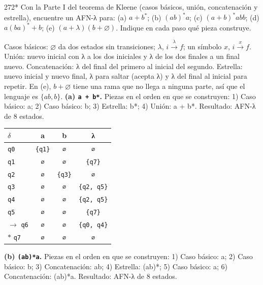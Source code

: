 \documentclass[11pt]{article}
\begin{document}


\begin{ejercicio}{272}{*}
Con la Parte I del teorema de Kleene (casos básicos, unión, concatenación y estrella), encuentre un AFN-λ para: (a) $a + b^*$; (b) $(ab)^*a$; (c) $(a + b)^*abb$; (d) $a(ba)^* + b$; (e) $(a + \lambda)(b + \varnothing)$. Indique en cada paso qué pieza construye.
\end{ejercicio}
\proc Casos básicos: $\varnothing$ da dos estados sin transiciones; $\lambda$, $i \xrightarrow{\lambda} f$; un símbolo $x$, $i \xrightarrow{x} f$. Unión: nuevo inicial con λ a los dos iniciales y λ de los dos finales a un final nuevo. Concatenación: λ del final del primero al inicial del segundo. Estrella: nuevo inicial y nuevo final, λ para saltar (acepta λ) y λ del final al inicial para repetir. En (e), $b + \varnothing$ tiene una rama que no llega a ninguna parte, así que el lenguaje es $\{ab, b\}$.
\textbf{(a) \texttt{a + b*}.} Piezas en el orden en que se construyen: 1) Caso básico: a; 2) Caso básico: b; 3) Estrella: b*; 4) Unión: a + b*. Resultado: AFN-λ de 8 estados.
\begin{center}\small\begin{tabular}{lccc}\toprule
$\delta$ & a & b & λ \\\midrule
 \texttt{q0} & \texttt{\{q1\}} & \texttt{∅} & \texttt{∅} \\
 \texttt{q1} & \texttt{∅} & \texttt{∅} & \texttt{\{q7\}} \\
 \texttt{q2} & \texttt{∅} & \texttt{\{q3\}} & \texttt{∅} \\
 \texttt{q3} & \texttt{∅} & \texttt{∅} & \texttt{\{q2, q5\}} \\
 \texttt{q4} & \texttt{∅} & \texttt{∅} & \texttt{\{q2, q5\}} \\
 \texttt{q5} & \texttt{∅} & \texttt{∅} & \texttt{\{q7\}} \\
$\to$ \texttt{q6} & \texttt{∅} & \texttt{∅} & \texttt{\{q0, q4\}} \\
$*$ \texttt{q7} & \texttt{∅} & \texttt{∅} & \texttt{∅} \\
\bottomrule\end{tabular}\end{center}
\textbf{(b) \texttt{(ab)*a}.} Piezas en el orden en que se construyen: 1) Caso básico: a; 2) Caso básico: b; 3) Concatenación: ab; 4) Estrella: (ab)*; 5) Caso básico: a; 6) Concatenación: (ab)*a. Resultado: AFN-λ de 8 estados.
\end{document}
